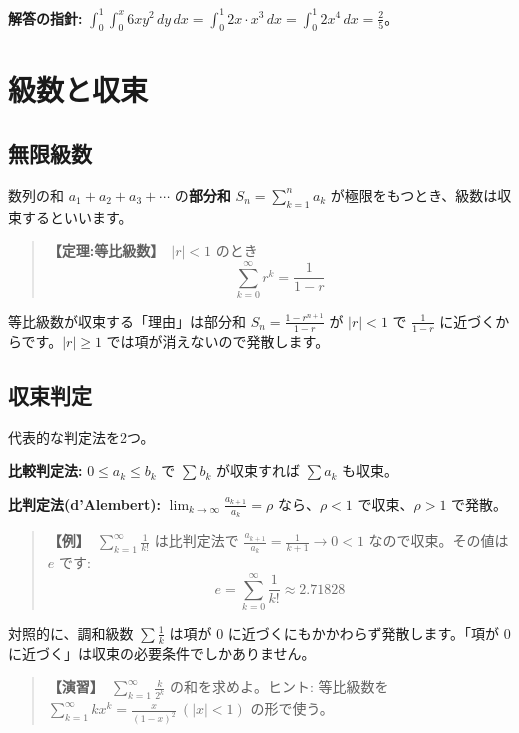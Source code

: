 \documentclass{article}
\begin{document}
\textbf{解答の指針:} \(\int_0^1 \int_0^x 6xy^2\, dy\, dx = \int_0^1 2x \cdot x^3\, dx = \int_0^1 2x^4\, dx = \frac{2}{5}\)。

\section{級数と収束}

\subsection{無限級数}

数列の和 \(a_1 + a_2 + a_3 + \cdots\) の\textbf{部分和} \(S_n = \sum_{k=1}^n a_k\) が極限をもつとき、級数は収束するといいます。

\begin{quote}
\textbf{【定理:等比級数】}\ \(|r| < 1\) のとき
\[ \sum_{k=0}^{\infty} r^k = \frac{1}{1 - r} \]
\end{quote}

等比級数が収束する「理由」は部分和 \(S_n = \frac{1 - r^{n+1}}{1-r}\) が \(|r| < 1\) で \(\frac{1}{1-r}\) に近づくからです。\(|r| \ge 1\) では項が消えないので発散します。

\subsection{収束判定}

代表的な判定法を2つ。

\textbf{比較判定法:} \(0 \le a_k \le b_k\) で \(\sum b_k\) が収束すれば \(\sum a_k\) も収束。

\textbf{比判定法(d'Alembert):} \(\displaystyle \lim_{k \to \infty} \frac{a_{k+1}}{a_k} = \rho\) なら、\(\rho < 1\) で収束、\(\rho > 1\) で発散。

\begin{quote}
\textbf{【例】}\ \(\displaystyle \sum_{k=1}^{\infty} \frac{1}{k!}\) は比判定法で \(\frac{a_{k+1}}{a_k} = \frac{1}{k+1} \to 0 < 1\) なので収束。その値は \(e\) です:
\[ e = \sum_{k=0}^{\infty} \frac{1}{k!} \approx 2.71828 \]
\end{quote}

対照的に、調和級数 \(\sum \frac{1}{k}\) は項が 0 に近づくにもかかわらず発散します。「項が 0 に近づく」は収束の必要条件でしかありません。

\begin{quote}
\textbf{【演習】}\ \(\displaystyle \sum_{k=1}^{\infty} \frac{k}{2^k}\) の和を求めよ。ヒント: 等比級数を \(\displaystyle \sum_{k=1}^\infty k x^k = \frac{x}{(1-x)^2}\ (|x|<1)\) の形で使う。
\end{quote}
\end{document}
